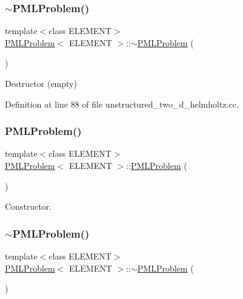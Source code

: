 \subsubsection{\texorpdfstring{$\sim$\+P\+M\+L\+Problem()}{~PMLProblem()}\hspace{0.1cm}{\footnotesize\ttfamily [1/2]}}
{\footnotesize\ttfamily template$<$class E\+L\+E\+M\+E\+NT$>$ \\
\hyperlink{classPMLProblem}{P\+M\+L\+Problem}$<$ E\+L\+E\+M\+E\+NT $>$\+::$\sim$\hyperlink{classPMLProblem}{P\+M\+L\+Problem} (\begin{DoxyParamCaption}{ }\end{DoxyParamCaption})\hspace{0.3cm}{\ttfamily [inline]}}



Destructor (empty) 



Definition at line 88 of file unstructured\+\_\+two\+\_\+d\+\_\+helmholtz.\+cc.

\mbox{\label{classPMLProblem_ae6cc833e2485ad6d37d6dd14105bf407}} 
\subsubsection{\texorpdfstring{P\+M\+L\+Problem()}{PMLProblem()}\hspace{0.1cm}{\footnotesize\ttfamily [2/2]}}
{\footnotesize\ttfamily template$<$class E\+L\+E\+M\+E\+NT$>$ \\
\hyperlink{classPMLProblem}{P\+M\+L\+Problem}$<$ E\+L\+E\+M\+E\+NT $>$\+::\hyperlink{classPMLProblem}{P\+M\+L\+Problem} (\begin{DoxyParamCaption}{ }\end{DoxyParamCaption})}



Constructor. 

\mbox{\label{classPMLProblem_a4922fc5b0ef4cf43c41ee9149712adb1}} 
\subsubsection{\texorpdfstring{$\sim$\+P\+M\+L\+Problem()}{~PMLProblem()}\hspace{0.1cm}{\footnotesize\ttfamily [2/2]}}
{\footnotesize\ttfamily template$<$class E\+L\+E\+M\+E\+NT$>$ \\
\hyperlink{classPMLProblem}{P\+M\+L\+Problem}$<$ E\+L\+E\+M\+E\+NT $>$\+::$\sim$\hyperlink{classPMLProblem}{P\+M\+L\+Problem} (\begin{DoxyParamCaption}{ }\end{DoxyParamCaption})\hspace{0.3cm}{\ttfamily [inline]}}




